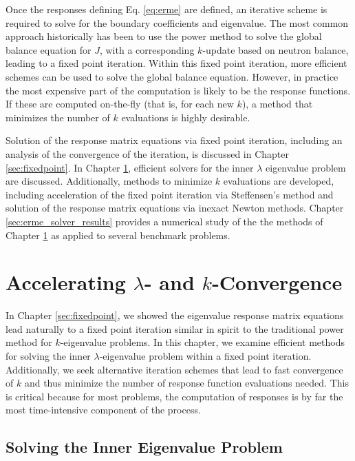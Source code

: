 Once the responses defining Eq. \ref{eq:erme}  are defined, an 
iterative scheme is 
required to solve for the boundary coefficients and eigenvalue.  The most
common approach historically has been to use the power method to solve the 
global balance equation for $J$, with a corresponding $k$-update 
based on neutron balance, leading to a fixed point iteration.  
Within this fixed point iteration, more efficient schemes can be 
used to solve the global balance equation.  
However, in practice the most expensive part of the computation is likely 
to be the response functions.  If these are computed on-the-fly (that is, 
for each new $k$), a method that minimizes the number of $k$ evaluations is
highly desirable.

Solution of the response matrix equations via fixed point iteration, 
including an analysis of the convergence of the iteration, is discussed
in Chapter \ref{sec:fixedpoint}.  In Chapter \ref{sec:newton}, efficient 
solvers for the inner $\lambda$ eigenvalue problem are discussed.
Additionally,
methods
to minimize $k$ evaluations are developed, including acceleration of the 
fixed point iteration via Steffensen's method and solution of the response 
matrix equations via inexact Newton methods.
Chapter \ref{sec:erme_solver_results} provides a numerical 
study of the the methods of  Chapter \ref{sec:newton} as applied 
to several benchmark problems.

\section{Accelerating $\lambda$- and $k$-Convergence}
\label{sec:newton}

In Chapter \ref{sec:fixedpoint}, we showed the eigenvalue response matrix 
equations lead naturally to a fixed point iteration similar in spirit to 
the traditional power method for $k$-eigenvalue problems.  In this chapter,
we examine efficient methods for solving the inner $\lambda$-eigenvalue 
problem within a fixed point iteration.  Additionally,
we seek alternative iteration schemes that lead to fast convergence of 
$k$ and thus minimize the number of response function evaluations needed.
This is critical because for most problems, the computation of responses 
is by far the most time-intensive component of the process.

\subsection{Solving the Inner Eigenvalue Problem}


